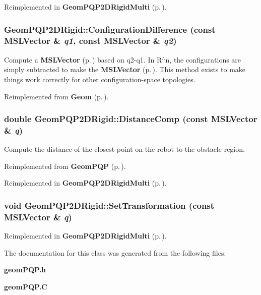 Reimplemented in {\bf Geom\-PQP2DRigid\-Multi} {\rm (p.\,\pageref{classGeomPQP2DRigidMulti_a2})}.
\subsubsection{ Geom\-PQP2DRigid::Configuration\-Difference (const {\bf MSLVector} \& {\em q1}, const {\bf MSLVector} \& {\em q2})\hspace{0.3cm}{\tt  [virtual]}}\label{classGeomPQP2DRigid_a4}


Compute a {\bf MSLVector} {\rm (p.\,\pageref{classMSLVector})} based on q2-q1. In R$^\wedge$n, the configurations are simply subtracted to make the {\bf MSLVector} {\rm (p.\,\pageref{classMSLVector})}. This method exists to make things work correctly for other configuration-space topologies.



Reimplemented from {\bf Geom} {\rm (p.\,\pageref{classGeom_a4})}.
\subsubsection{\setlength{\rightskip}{0pt plus 5cm}double Geom\-PQP2DRigid::Distance\-Comp (const {\bf MSLVector} \& {\em q})\hspace{0.3cm}{\tt  [virtual]}}\label{classGeomPQP2DRigid_a3}


Compute the distance of the closest point on the robot to the obstacle region.



Reimplemented from {\bf Geom\-PQP} {\rm (p.\,\pageref{classGeomPQP_a5})}.

Reimplemented in {\bf Geom\-PQP2DRigid\-Multi} {\rm (p.\,\pageref{classGeomPQP2DRigidMulti_a3})}.
\subsubsection{\setlength{\rightskip}{0pt plus 5cm}void Geom\-PQP2DRigid::Set\-Transformation (const {\bf MSLVector} \& {\em q})}\label{classGeomPQP2DRigid_a5}




Reimplemented in {\bf Geom\-PQP2DRigid\-Multi} {\rm (p.\,\pageref{classGeomPQP2DRigidMulti_a5})}.

The documentation for this class was generated from the following files:\begin{CompactItemize}
\item 
{\bf geom\-PQP.h}\item 
{\bf geom\-PQP.C}\end{CompactItemize}
